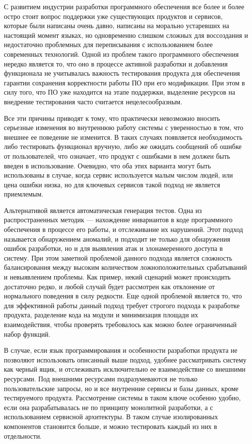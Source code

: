 С развитием индустрии разработки программного обеспечения все более и более
остро стоит вопрос поддержки уже существующих продуктов и сервисов, которые
были написаны очень давно, написаны на морально устаревших на настоящий момент
языках, но одновременно слишком сложных для воссоздания и недостаточно
проблемных для переписывания с использованием более современных технологий.
Одной из проблем такого программного обеспечения нередко является то, что
оно в процессе активной разработки и добавления функционала не учитывалась
важность тестирования продукта для обеспечения гарантии сохранения корректности
работы ПО при его модификации. При этом в силу того, что ПО уже находится на
этапе поддержки, выделение ресурсов на внедрение тестирования часто считается
нецелесообразным.

Все эти причины приводят к тому, что практически невозможно вносить серьезные
изменения во внутреннюю работу системы с уверенностью в том, что внешнее ее
поведение не изменится. В таких случаях появляется необходимость либо
тестировать функционал вручную, либо же ожидать сообщений об ошибке от
пользователей, что означает, что продукт с ошибками в нем должен быть введен
в использование. Очевидно, что оба этих варианта могут быть использованы в случае,
когда сервис используется малым числом людей, или цена ошибки низка, но для
ключевых сервисов такой подход не является приемлемым.

Альтернативой является автоматическая генерация тестов. Одна из распространенных
методик --- нахождение инвариантов в коде программного обеспечения в процессе
его работы, и отслеживание их нарушений. Этот подход называется обнаружением
аномалий, и подходит не только для обнаружения ошибок разработки, но и для
выявления атак и злонамеренного доступа в систему. При этом заметной проблемой
данного подхода является сложность балансирования между высоким количеством
ложноположительных срабатываний и невыявлением проблемы. Как пример, некий
сценарий может происходить достаточно редко, и любой случай будет рассмотрен
как отклонение от нормального поведения в силу редкости. Еще одной проблемой
является то, что для эффективной работы данный подход требует строгого подхода
к разработке продукта, разделение кода на модули и минимизация площади их
взаимодействия, чтобы проверять требовалось как можно более ограниченный набор
функций.

В случае, если язык программирования и особенности разработки продукта не
позволяют использовать описанный выше подход, удобнее рассматривать систему как
черный ящик, и отслеживать исключительно ее взаимодействие со внешними
ресурсами. Под внешними ресурсами подразумеваются не только пользовательские
запросы, но и все внутренние сервисы и базы данных, кроме тестируемого продукта.
Рассмотрение системы в таком ключе особенно удобно, если она разрабатывалась
не по принципу монолитной разработки, а с использованием сервисной архитектуры.
В таком случае изолированных компонентов становится больше, и можно тестировать
каждый из них в отдельности.

